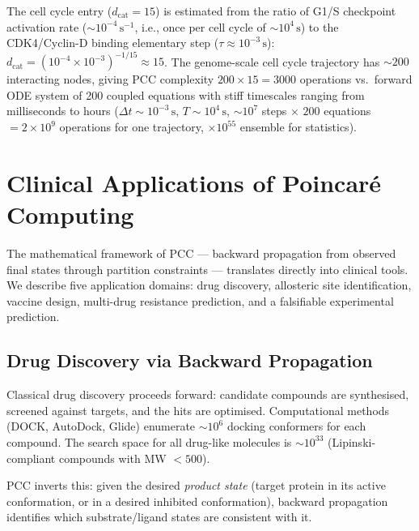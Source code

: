 \begin{remark}
The cell cycle entry ($d_{\mathrm{cat}} = 15$) is estimated from the
ratio of G1/S checkpoint activation rate ($\sim 10^{-4}\,\mathrm{s}^{-1}$,
i.e., once per cell cycle of $\sim 10^4\,\mathrm{s}$) to the CDK4/Cyclin-D
binding elementary step ($\tau \approx 10^{-3}\,\mathrm{s}$):
$d_{\mathrm{cat}} = (10^{-4} \times 10^{-3})^{-1/15} \approx 15$.
The genome-scale cell cycle trajectory has $\sim 200$ interacting nodes,
giving PCC complexity $200 \times 15 = 3000$ operations vs.\ forward ODE
system of 200 coupled equations with stiff timescales ranging from
milliseconds to hours ($\Delta t \sim 10^{-3}\,\mathrm{s}$, $T \sim 10^4\,
\mathrm{s}$, $\sim 10^7$ steps $\times$ $200$ equations $= 2 \times 10^9$
operations for one trajectory, $\times 10^{55}$ ensemble for statistics).
\end{remark}

\section{Clinical Applications of Poincaré Computing}
\label{sec:ch05-applications}

The mathematical framework of PCC --- backward propagation from observed
final states through partition constraints --- translates directly into
clinical tools.  We describe five application domains: drug discovery,
allosteric site identification, vaccine design, multi-drug resistance
prediction, and a falsifiable experimental prediction.

\subsection{Drug Discovery via Backward Propagation}

Classical drug discovery proceeds forward: candidate compounds are
synthesised, screened against targets, and the hits are optimised.
Computational methods (DOCK, AutoDock, Glide) enumerate $\sim 10^6$
docking conformers for each compound.  The search space for all
drug-like molecules is $\sim 10^{33}$ (Lipinski-compliant compounds with
MW $< 500$).

PCC inverts this: given the desired \emph{product state} (target protein
in its active conformation, or in a desired inhibited conformation), backward
propagation identifies which substrate/ligand states are consistent with it.


